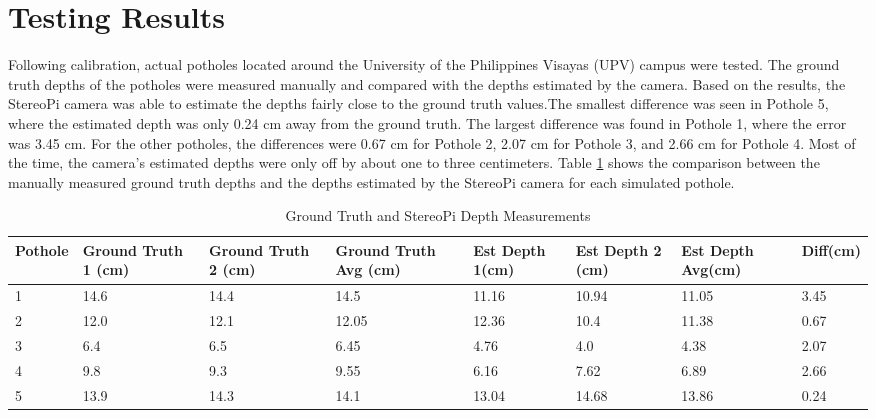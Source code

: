 \section{\textbf{Testing Results} }
Following calibration, actual potholes located around the University of the Philippines Visayas (UPV) campus were tested. The ground truth depths of the potholes were measured manually and compared with the depths estimated by the camera. Based on the results, the StereoPi camera was able to estimate the depths fairly close to the ground truth values.The smallest difference was seen in Pothole 5, where the estimated depth was only 0.24 cm away from the ground truth. The largest difference was found in Pothole 1, where the error was 3.45 cm. For the other potholes, the differences were 0.67 cm for Pothole 2, 2.07 cm for Pothole 3, and 2.66 cm for Pothole 4. Most of the time, the camera’s estimated depths were only off by about one to three centimeters. Table \ref{tab:comparison} shows the comparison between the manually measured ground truth depths and the depths estimated by the StereoPi camera for each simulated pothole.

\begin{table}[H]
	\centering
	\hspace{-2cm}
	\small 
	\caption{Ground Truth and StereoPi Depth Measurements}
	\begin{tabular}{|p{1.5cm}|p{1.5cm}|p{1.5cm}|p{1.5cm}|p{1.5cm}|p{1.5cm}|p{1.5cm}|p{1.5cm}|}
		\hline
		\textbf{Pothole} & \textbf{Ground Truth 1 (cm)} & \textbf{Ground Truth 2 (cm)} & \textbf{Ground Truth Avg (cm)} & \textbf{Est Depth 1(cm)} & \textbf{Est Depth 2 (cm)} & \textbf{Est Depth Avg(cm)} & \textbf{Diff(cm)} \\ \hline
		
		1 & 14.6 & 14.4 & 14.5 & 11.16 & 10.94 & 11.05 & 3.45  \\ \hline
		2 & 12.0 & 12.1 & 12.05 & 12.36 & 10.4 & 11.38 & 0.67 \\ \hline
		3 & 6.4 & 6.5 & 6.45 & 4.76 & 4.0 & 4.38 & 2.07 \\ \hline
		4 & 9.8 & 9.3 & 9.55 & 6.16 & 7.62 & 6.89 & 2.66 \\ \hline
		5 & 13.9 & 14.3 & 14.1 & 13.04 & 14.68 & 13.86 & 0.24 \\ \hline
		
	\end{tabular}
	\label{tab:comparison}
	\hspace{-3cm}
\end{table}

